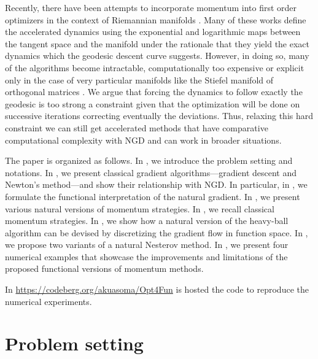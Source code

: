 \documentclass{article}
\theoremstyle{noparens}
\begin{document}
Recently, there have been attempts to incorporate momentum into first order optimizers in the context of Riemannian manifolds \cite{kimNesterovAccelerationRiemannian2022,brantnerGeneralizingAdamManifolds2023,ahnNesterovsEstimateSequence2020,zhangRiemannianAcceleratedGradient2018}. Many of these works define the accelerated dynamics using the exponential and logarithmic maps between the tangent space and the manifold under the rationale that they yield the exact dynamics which the geodesic descent curve suggests. However, in doing so, many of the algorithms become intractable, computationally too expensive or explicit only in the case of very particular manifolds like the Stiefel manifold of orthogonal matrices \cite{absilOptimizationAlgorithmsMatrix2008}. We argue that forcing the dynamics to follow exactly the geodesic is too strong a constraint given that the optimization will be done on successive iterations correcting eventually the deviations. Thus, relaxing this hard constraint we can still get accelerated methods that have comparative computational complexity with NGD and can work in broader situations.


The paper is organized as follows. In , we introduce the problem setting and notations. In , we present classical gradient algorithms—gradient descent and Newton's method—and show their relationship with NGD. In particular, in , we formulate the functional interpretation of the natural gradient. In , we present various natural versions of momentum strategies. In , we recall classical momentum strategies. In , we show how a natural version of the heavy-ball algorithm can be devised by discretizing the gradient flow  in function space. In , we propose two variants of a natural Nesterov method. In , we present four numerical examples that showcase the improvements and limitations of the proposed functional versions of momentum methods.
\newline

In \url{https://codeberg.org/akuasoma/Opt4Fun} is hosted the code to reproduce the numerical experiments.











\section{Problem setting}
\label{sec:setting}
\end{document}
